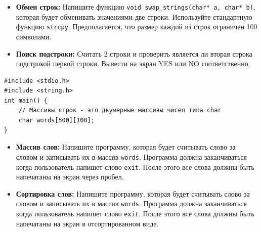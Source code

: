 \documentclass{article}
\begin{document}
\begin{itemize}
\item \textbf{Обмен строк:} Напишите функцию \texttt{void swap\_strings(char* a, char* b)}, которая будет обменивать значениями две строки. Используйте стандартную функцию \texttt{strcpy}. Предполагается, что размер каждой из строк ограничен 100 символами.
\item \textbf{Поиск подстроки:} Считать 2 строки и проверить является ли вторая строка подстрокой первой строки. Вывести на экран YES или NO соответственно.
\end{itemize}
\begin{lstlisting}
#include <stdio.h>
#include <string.h>
int main() {
    // Массивы строк - это двумерные массивы чисел типа char
    char words[500][100];
}
\end{lstlisting}
\begin{itemize}
\item \textbf{Массив слов:} Напишите программу, которая будет считывать слово за словом и записывать их в массив \texttt{words}. Программа должна заканчиваться когда пользователь напишет слово \texttt{exit}. После этого все слова должны быть напечатаны на экран через пробел. 
\item \textbf{Сортировка слов:} Напишите программу, которая будет считывать слово за словом и записывать их в массив \texttt{words}. Программа должна заканчиваться когда пользователь напишет слово \texttt{exit}. После этого все слова должны быть напечатаны на экран в отсортированном виде.
\end{itemize}
\end{document}
